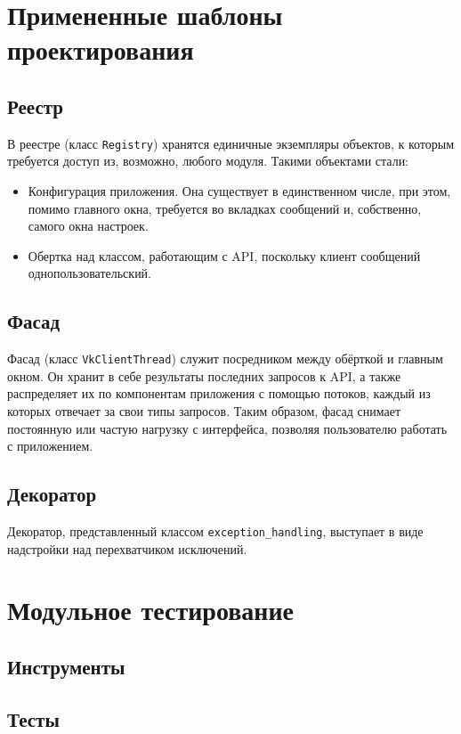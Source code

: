 \documentclass[12pt]{article}
\begin{document}
\newpage
\section{Примененные шаблоны проектирования}
\subsection{Реестр}
В реестре (класс {\tt Registry}) хранятся единичные экземпляры объектов, к которым требуется доступ из, возможно, любого модуля. Такими объектами стали:
\begin{itemize}
\setlength{\itemsep}{-1mm} %
\item Конфигурация приложения. Она существует в единственном числе, при этом, помимо главного окна, требуется во вкладках сообщений и, собственно, самого окна настроек.
\item Обертка над классом, работающим с API, поскольку клиент сообщений однопользовательский.
\end{itemize}

\subsection{Фасад}
Фасад (класс {\tt VkClientThread}) служит посредником между обёрткой и главным окном. Он хранит в себе результаты последних запросов к API, а также распределяет их по компонентам приложения с помощью потоков, каждый из которых отвечает за свои типы запросов. Таким образом, фасад снимает постоянную или частую нагрузку с интерфейса, позволяя пользователю работать с приложением.

\subsection{Декоратор}
Декоратор, представленный классом {\tt exception\_handling}, выступает в виде надстройки над перехватчиком исключений. %



\newpage
\section{Модульное тестирование}
\subsection{Инструменты}

\subsection{Тесты}
\end{document}

